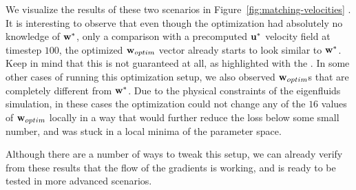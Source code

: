 We visualize the results of these two scenarios in
Figure~\ref{fig:matching-velocities} . It is interesting to observe that even
though the optimization had absolutely no knowledge of $\vb{w}^*$, only
a comparison with a precomputed $\vb{u^*}$ velocity field at timestep $100$, the
optimized $\vb{w}_{optim}$ vector already starts to look similar to $\vb{w}^*$.
Keep in mind that this is not guaranteed at all, as highlighted with the
. In some other cases of running this
optimization setup, we also observed $\vb{w}_{optim}$s that are completely
different from $\vb{w}^*$. Due to the physical constraints of the eigenfluids
simulation, in these cases the optimization could not change any of the $16$
values of $\vb{w}_{optim}$ locally in a way that would further reduce the loss
below some small number, and was stuck in a local minima of the parameter space.

Although there are a number of ways to tweak this setup, we can already verify
from these results that  the flow of the gradients is working, and is ready to
be tested in more advanced scenarios.

